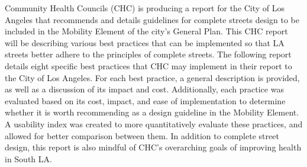 Community Health Councils (CHC) is producing a report for the City of Los Angeles that recommends and details guidelines for complete streets design to be included in the Mobility Element of the city’s General Plan. This CHC report will be describing various best practices that can be implemented so that LA streets better adhere to the principles of complete streets. The following report details eight specific best practices that CHC may implement in their report to the City of Los Angeles. For each best practice, a general description is provided, as well as a discussion of its impact and cost. Additionally, each practice was evaluated based on its cost, impact, and ease of implementation to determine whether it is worth recommending as a design guideline in the Mobility Element. A usability index was created to more quantitatively evaluate these practices, and allowed for better comparison between them. In addition to complete street design, this report is also mindful of CHC’s overarching goals of improving health in South LA.